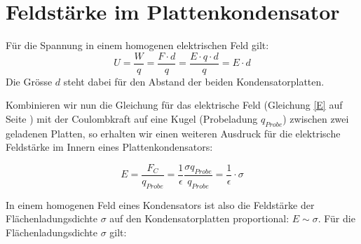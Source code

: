 \documentclass[11pt,twoside=false,open=any]{scrbook}
\begin{document}
\section{Feldstärke im Plattenkondensator}
Für die Spannung in einem homogenen elektrischen Feld gilt:
\begin{equation}
U = \frac{W}{q} = \frac{F \cdot d}{q} = \frac{E \cdot q \cdot d}{q} = E \cdot d
\label{UinE}
\end{equation}
Die Grösse $d$ steht dabei für den Abstand der beiden Kondensatorplatten.
\begin{center}
   \setlength{\fboxrule}{2pt}
\end{center}

Kombinieren wir nun die Gleichung für das elektrische Feld (Gleichung \ref{E} auf Seite \pageref{E}) mit der Coulombkraft auf eine Kugel (Probeladung $q_{Probe}$) zwischen zwei geladenen Platten, so erhalten wir einen weiteren Ausdruck für die elektrische Feldstärke im Innern eines Plattenkondensators:

\begin{equation}
E = \frac{F_{C}}{q_{Probe}} = \frac{1}{\epsilon} \frac{\sigma q_{Probe}}{q_{Probe}} = \frac{1}{\epsilon} \cdot \sigma
\label{Eplattenkondensator2}
\end{equation}

In einem homogenen Feld eines Kondensators ist also die Feldstärke der Flächenladungsdichte $\sigma$ auf den Kondensatorplatten proportional: $E \sim \sigma$. Für die Flächenladungsdichte $\sigma$ gilt:
\end{document}
